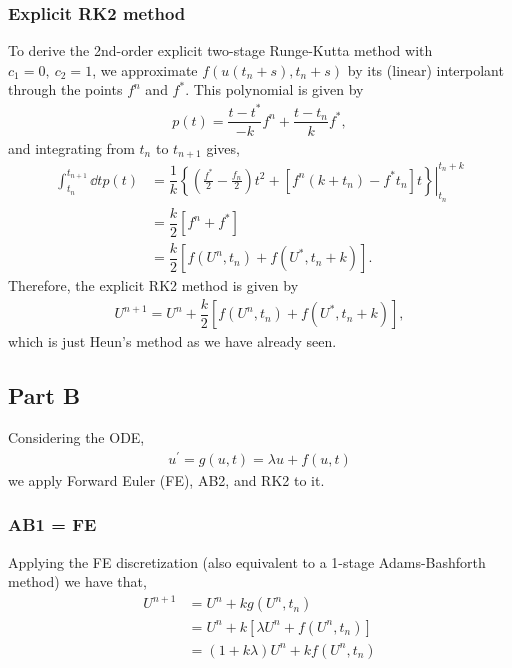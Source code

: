 \documentclass[12pt]{article}
\begin{document}
\subsubsection*{Explicit RK2 method}

To derive the 2nd-order explicit two-stage Runge-Kutta method with $c_{1} = 0,\ c_{2} = 1$, we approximate $f(u(t_{n}+s), t_{n}+s)$ by its (linear) interpolant through the points $f^{n}$ and $f^{*}$. This polynomial is given by
\begin{align}
    p(t) = \dfrac{t-t^{*}}{-k}f^{n}+\dfrac{t-t_{n}}{k}f^{*},
\end{align}
and integrating from $t_{n}$ to $t_{n+1}$ gives,
\begin{subequations}
    \begin{align}
        \int_{t_{n}}^{t_{n+1}}\dd{t} p(t) &= \dfrac{1}{k}\left.\left\{
            \left(\frac{f^{*}}{2}-\frac{f_{n}}{2}\right)t^2
            +\left[f^{n}(k+t_{n})-f^{*}t_{n}\right]t
        \right\}\right|_{t_{n}}^{t_{n}+k}\\
        &= \dfrac{k}{2}\left[f^{n}+f^{*}\right]\\
        &= \dfrac{k}{2}\left[f(U^{n},t_{n}) + f(U^{*},t_{n}+k)\right].
    \end{align}
\end{subequations}
Therefore, the explicit RK2 method is given by 
\begin{align}
    U^{n+1} = U^{n} + \dfrac{k}{2}\left[f(U^{n},t_{n}) + f(U^{*},t_{n}+k)\right],\label{eq:rk2_form}
\end{align}
which is just Heun's method as we have already seen.

\subsection*{Part B}

Considering the ODE,
\begin{align}
    u^{\prime} = g(u,t) = \lambda u + f(u,t)
\end{align}
we apply Forward Euler (FE), AB2, and RK2 to it. 

\subsubsection*{AB1 = FE}
Applying the FE discretization (also equivalent to a 1-stage Adams-Bashforth method) we have that,
\begin{subequations}
    \begin{align}
    U^{n+1} &= U^{n} + k g(U^{n},t_{n})\\
    &= U^{n} + k \left[\lambda U^{n} + f(U^{n},t_{n})\right]\\
    &= (1+k\lambda)U^{n} + kf(U^{n},t_{n})
    \end{align}
\end{subequations}
\end{document}
